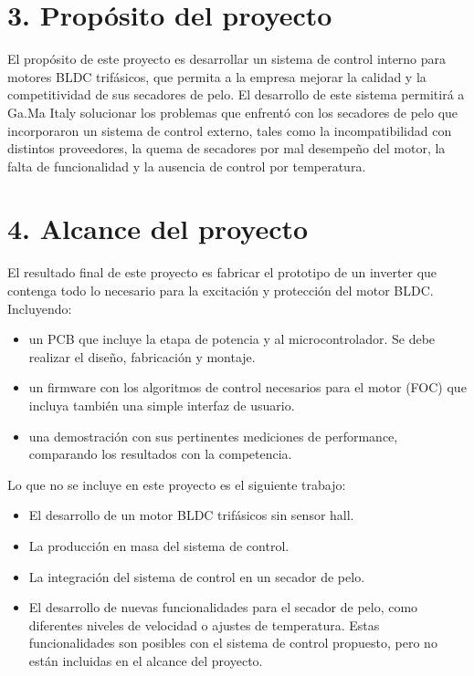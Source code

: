 \documentclass[
11pt, %
codirector, %
]{charter}
\begin{document}
\section{3. Propósito del proyecto}
\label{sec:proposito}

El propósito de este proyecto es desarrollar un sistema de control interno para motores BLDC trifásicos, que permita a la empresa mejorar la calidad y la competitividad de sus secadores de pelo. El desarrollo de este sistema permitirá a Ga.Ma Italy solucionar los problemas que enfrentó con los secadores de pelo que incorporaron un sistema de control externo, tales como la incompatibilidad con distintos proveedores, la quema de secadores por mal desempeño del motor, la falta de funcionalidad y la ausencia de control por temperatura.

\section{4. Alcance del proyecto}
\label{sec:alcance}

El resultado final de este proyecto es fabricar el prototipo de un inverter que contenga todo lo necesario
para la excitación y protección del motor BLDC. Incluyendo:

\begin{itemize}
	\item un PCB que incluye la etapa de potencia y al microcontrolador. Se debe realizar el diseño, fabricación y montaje.
	\item un firmware con los algoritmos de control necesarios para el motor (FOC) que incluya también una simple interfaz de usuario.
	\item una demostración con sus pertinentes mediciones de performance, comparando los resultados con la competencia.
\end{itemize}

Lo que no se incluye en este proyecto es el siguiente trabajo:

\begin{itemize}
	\item El desarrollo de un motor BLDC trifásicos sin sensor hall.
	\item La producción en masa del sistema de control.
	\item La integración del sistema de control en un secador de pelo.
	\item El desarrollo de nuevas funcionalidades para el secador de pelo, como diferentes niveles de velocidad o ajustes de temperatura. Estas funcionalidades son posibles con el sistema de control propuesto, pero no están incluidas en el alcance del proyecto.
\end{itemize}
\end{document}
